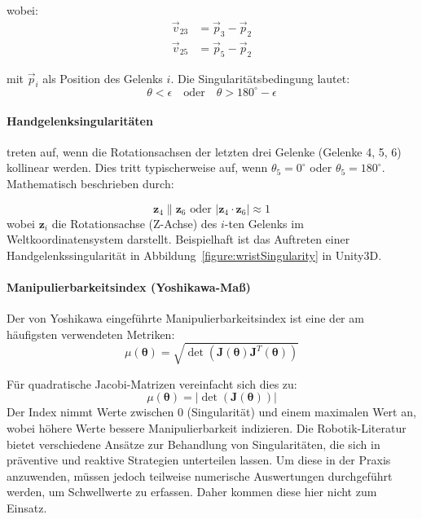 wobei:
\begin{align}
  \vec{v}_{23} & = \vec{p}_3 - \vec{p}_2 \\
  \vec{v}_{25} & = \vec{p}_5 - \vec{p}_2
\end{align}

mit $\vec{p}_i$ als Position des Gelenks $i$. Die Singularitätsbedingung lautet:
\begin{equation}
  \theta < \epsilon \quad \text{oder} \quad \theta > 180^\circ - \epsilon
\end{equation}

\paragraph{Handgelenksingularitäten} treten auf, wenn die Rotationsachsen der
letzten drei Gelenke (Gelenke 4, 5, 6) kollinear werden. Dies tritt
typischerweise auf, wenn $\theta_5 = 0^\circ$ oder $\theta_5 =
180^\circ$. Mathematisch
beschrieben durch:

\begin{equation}
  \mathbf{z}_4 \parallel \mathbf{z}_6 \text{ oder } |\mathbf{z}_4
  \cdot \mathbf{z}_6| \approx 1
  \label{eq:wrist_singularity}
\end{equation}
\noindent
wobei $\mathbf{z}_i$ die Rotationsachse (Z-Achse) des $i$-ten Gelenks im
Weltkoordinatensystem darstellt. Beispielhaft ist das Auftreten einer
Handgelenkssingularität in Abbildung~\ref{figure:wristSingularity}
in Unity3D.

\paragraph{Manipulierbarkeitsindex (Yoshikawa-Maß)} Der von Yoshikawa
\cite{yoshikawa1985manipulability} eingeführte Manipulierbarkeitsindex ist eine
der am häufigsten verwendeten Metriken:
\begin{equation}
  \mu(\boldsymbol{\theta}) =
  \sqrt{\det(\mathbf{J}(\boldsymbol{\theta})\mathbf{J}^T(\boldsymbol{\theta}))}
  \label{eq:yoshikawa_measure}
\end{equation}

Für quadratische Jacobi-Matrizen vereinfacht sich dies zu:
\begin{equation}
  \mu(\boldsymbol{\theta}) = |\det(\mathbf{J}(\boldsymbol{\theta}))|
  \label{eq:yoshikawa_simplified}
\end{equation}
\noindent
Der Index nimmt Werte zwischen 0 (Singularität) und einem maximalen Wert an,
wobei höhere Werte bessere Manipulierbarkeit indizieren. Die Robotik-Literatur
bietet verschiedene Ansätze zur Behandlung von Singularitäten, die sich in
präventive und reaktive Strategien unterteilen lassen. Um diese in der Praxis
anzuwenden, müssen jedoch teilweise numerische Auswertungen durchgeführt werden,
um Schwellwerte zu erfassen. Daher kommen diese hier nicht zum Einsatz.

